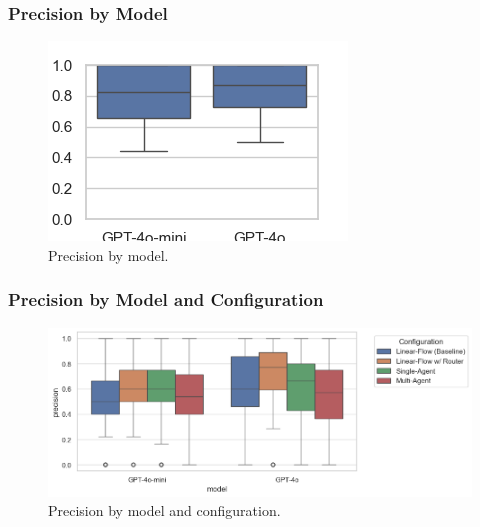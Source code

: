             \subsubsection{Precision by Model}
            \begin{figure}[H]
                \centering
                \includegraphics[scale=0.75]{images_exp2/precision/precision_by_model.png}
                \caption{Precision by model.}
                \label{fig:precision_by_model}
            \end{figure}

            \subsubsection{Precision by Model and Configuration}
            \begin{figure}[H]
                \centering
                \includegraphics[scale=0.75]{images_exp2/precision/precision_by_model_and_configuration.png}
                \caption{Precision by model and configuration.}
                \label{fig:precision_by_model_and_configuration}
            \end{figure}

